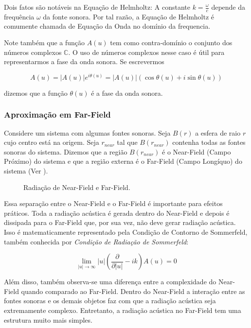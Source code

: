 Dois fatos são notáveis na Equação de Helmholtz: A constante $k = \frac{\omega}{c}$ depende da frequência $\omega$ da fonte sonora. Por tal razão, a Equação de Helmholtz é comumente chamada de Equação da Onda no domínio da frequencia.

Note também que a função $A(u)$ tem como contra-domínio o conjunto dos números complexos $\mathbb{C}$. O uso de números complexos nesse caso é útil para representarmos a fase da onda sonora. Se escrevermos

\begin{equation}
	A(u) = |A(u)| e^{i\theta(u)} = |A(u)| (\cos \theta(u) + i\sin \theta(u))
\end{equation}

dizemos que a função $\theta(u)$ é a fase da onda sonora.

\subsubsection{Aproximação em Far-Field}

Considere um sistema com algumas fontes sonoras. Seja $B(r)$ a esfera de raio $r$ cujo centro está na origem. Seja $r_{near}$ tal que $B(r_{near})$ contenha todas as fontes sonoras do sistema. Dizemos que a região $B(r_{near})$ é o Near-Field (Campo Próximo) do sistema e que a região externa é o Far-Field (Campo Longíquo) do sistema (Ver ).

\begin{figure}[ht]
	\centering
	
	\caption[Radiação de Near-Field e Far-Field]{Radiação de Near-Field e Far-Field.}\label{fig:farfield}
\end{figure}

Essa separação entre o Near-Field e o Far-Field é importante para efeitos práticos. Toda a radiação acústica é gerada dentro do Near-Field e depois é dissipada para o Far-Field que, por sua vez, não deve gerar radiação acústica. Isso é matematicamente representado pela Condição de Contorno de Sommerfeld, também conhecida por \emph{Condição de Radiação de Sommerfeld}:

\begin{equation}
	\lim_{|u| \rightarrow \infty} |u| \left(\frac{\partial}{\partial |u|} - ik \right) A(u) = 0 \label{eq:sommerfeld_condition}
\end{equation}

Além disso, também observa-se uma diferença entre a complexidade do Near-Field quando comparado ao Far-Field. Dentro do Near-Field a interação entre as fontes sonoras e os demais objetos faz com que a radiação acústica seja extremamente complexo. Entretanto, a radiação acústica no Far-Field tem uma estrutura muito mais simples.

